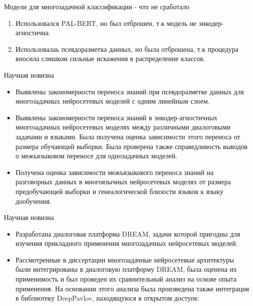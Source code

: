 \begin{frame}{Модели для многозадачной классификации - что не сработало}
\begin{enumerate}
\item Использовался PAL-BERT, но был отброшен, т.к модель не энкодер-агностична.
\item Использовалаь псевдоразметка данных, но была отброшена, т.к процедура вносила слишком сильные искажения в распределение классов.
\end{enumerate}
\end{frame}


\begin{frame}{Научная новизна}
\begin{itemize}
  \item {Выявлены закономерности переноса знаний при псевдоразметке данных для многозадачных нейросетевых моделей с одним линейным слоем.}
  \item {Выявлены закономерности переноса знаний в энкодер-агностичных многозадачных нейросетевых моделях между различными диалоговыми задачами и языками. Была получена оценка зависимости этого переноса от размера обучающей выборки. Была проверена также справедливость выводов о межъязыковом переносе для однозадачных моделей.}
  \item {Получена оценка зависимости межъязыкового переноса знаний на разговорных данных в многоязычных нейросетевых моделях от размера предобучающей выборки и генеалогической близости языков к языку дообучения.}
\end{itemize}    
\end{frame}

\begin{frame}{Научная новизна}
\begin{itemize}
  \item {Разработана диалоговая платформа DREAM, задачи которой пригодны для изучения прикладного применения многозадачных нейросетевых моделей.}
  \item {Рассмотренные в диссертации многозадачные нейросетевые архитектуры были интегрированы в диалоговую платформу DREAM, была оценена их применимость и был проведен их сравнительный анализ на основе опыта применения. На основании этого анализа была произведена также интеграция в библиотеку DeepPavlov, находящуюся в открытом доступе.}
\end{itemize}    
\end{frame}




